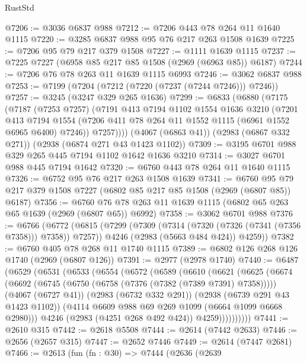 \begin{lexlean}{RustStd}
\begin{coremodule}
@7206 := @3036 @6837 @988
@7212 := @7206 @443 @78 @264 @11 @1640 @1115
@7220 := @3285 @6837 @988 @95 @76 @217 @263 @1508 @1639
@7225 := @7206 @95 @79 @217 @379 @1508
@7227 := @1111 @1639 @1115
@7237 := @7225 @7227 (@6958 @85 @217 @85 @1508 (@2969 (@6963 @85)) @6187)
@7244 := @7206 @76 @78 @263 @11 @1639 @1115 @6993
@7246 := @3062 @6837 @988
@7253 := @7199 (@7204 (@7212 (@7220 (@7237 (@7244 @7246))) @7246))
@7257 := @3245 (@3247 @329 @265 @1636)
@7299 := @6833
    (@6880
      (@7175
        (@7187
          (@7253 @7257)
          (@7191
            @413
            @7194
            @1102
            @1554
            @1636
            @3210
            (@7201
              @413
              @7194
              @1554
              (@7206 @411 @78 @264 @11 @1552 @1115 (@6961 @1552 @6965 @6400) @7246))
            @7257))))
    (@4067 (@6863 @41))
    (@2983 (@6867 @332 @271))
    (@2938 (@6874 @271 @43 @1423 @1102))
@7309 := @3195 @6701 @988 @329 @265 @445 @7194 @1102 @1642 @1636 @3210
@7314 := @3027 @6701 @988 @445 @7194 @1642
@7320 := @6760 @443 @78 @264 @11 @1640 @1115
@7326 := @6752 @95 @76 @217 @263 @1508 @1639
@7341 := @6760 @95 @79 @217 @379 @1508 @7227 (@6802 @85 @217 @85 @1508 (@2969 (@6807 @85)) @6187)
@7356 := @6760 @76 @78 @263 @11 @1639 @1115 (@6802 @65 @263 @65 @1639 (@2969 (@6807 @65)) @6992)
@7358 := @3062 @6701 @988
@7376 := @6766
    (@6772
      (@6815
        (@7299 (@7309 (@7314 (@7320 (@7326 (@7341 (@7356 @7358))) @7358)) @7257))
        @4246
        (@2983 (@5663 @484 @424))
        @4259))
@7382 := @6760 @405 @78 @268 @11 @1740 @1115
@7389 := @6802 @126 @268 @126 @1740 (@2969 (@6807 @126))
@7391 := @2977 (@2978 @1740)
@7440 := @6487
    (@6529
      (@6531
        (@6533
          (@6554
            (@6572
              (@6589
                (@6610
                  (@6621
                    (@6625
                      (@6674
                        (@6692
                          (@6745 (@6750 (@6758 (@7376 (@7382 (@7389 @7391) @7358)))))
                          (@4067 (@6727 @41))
                          (@2983 (@6732 @332 @291))
                          (@2938 (@6739 @291 @43 @1423 @1102))
                          (@4114 @6609 @988 @69 @269 @1099 (@6664 @1099 @6668 @2980)))
                        @4246
                        (@2983 (@4251 @268 @492 @424))
                        @4259))))))))))
@7441 := @2610 @315
@7442 := @2618 @5508
@7444 := @2614 (@7442 @2633)
@7446 := @2656 (@2657 @315)
@7447 := @2652 @7446
@7449 := @2614 (@7447 @2681)
@7466 := @2613
    (fun (fn : @30) =>
    @7444
      (@2636
        (@2639

\end{coremodule}
\end{lexlean}

